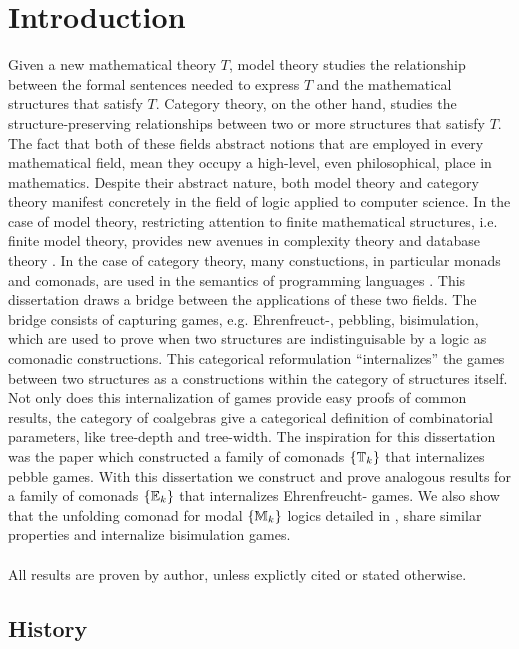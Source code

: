 \chapter{Introduction} 
Given a new mathematical theory $T$, model theory studies the relationship between the formal sentences needed to express $T$ and the mathematical structures that satisfy $T$. Category theory, on the other hand, studies the structure-preserving relationships between two or more structures that satisfy $T$. The fact that both of these fields abstract notions that are employed in every mathematical field, mean they occupy a high-level, even philosophical\cite{Mancosu2010}\cite{Landry2017}, place in mathematics. Despite their abstract nature, both model theory and category theory manifest concretely in the field of logic applied to computer science. In the case of model theory, restricting attention to finite mathematical structures, i.e. finite model theory, provides new avenues in complexity theory \cite{Immerman1998} and database theory \cite{Abiteboul1995}. In the case of category theory, many constuctions, in particular monads and comonads, are used in the semantics of programming languages \cite{BrookesGeva1992}. This dissertation draws a bridge between the applications of these two fields. The bridge consists of capturing games, e.g. Ehrenfreuct-{\Fraisse}, pebbling, bisimulation, which are used to prove when two structures are indistinguisable by a logic as comonadic constructions. This categorical reformulation ``internalizes'' the games between two structures as a constructions within the category of structures itself. Not only does this internalization of games provide easy proofs of common results, the category of coalgebras give a categorical definition of combinatorial parameters, like tree-depth and tree-width. The inspiration for this dissertation was the paper \cite{Abramsky2017} which constructed a family of comonads $\{{\mathbb{T}_{k}}\}$ that internalizes pebble games. With this dissertation we construct and prove analogous results for a family of comonads $\{{\mathbb{E}_{k}}\}$ that internalizes Ehrenfreucht-{\Fraisse} games. We also show that the unfolding comonad for modal $\{{\mathbb{M}_{k}}\}$ logics detailed in \cite{Gradel2014}, share similar properties and internalize bisimulation games.  
\\~\\
\noindent All results are proven by author, unless explictly cited or stated otherwise. 
\section{History}
